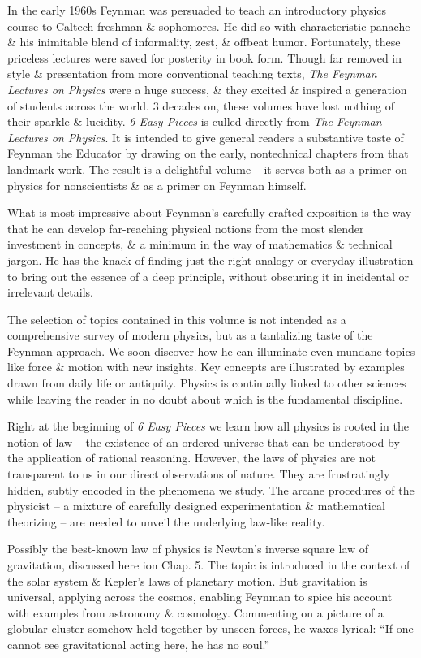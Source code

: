 \documentclass{article}
\begin{document}
In the early 1960s {\sc Feynman} was persuaded to teach an introductory physics course to Caltech freshman \& sophomores. He did so with characteristic panache \& his inimitable blend of informality, zest, \& offbeat humor. Fortunately, these priceless lectures were saved for posterity in book form. Though far removed in style \& presentation from more conventional teaching texts, {\it The Feynman Lectures on Physics} were a huge success, \& they excited \& inspired a generation of students across the world. 3 decades on, these volumes have lost nothing of their sparkle \& lucidity. {\it6 Easy Pieces} is culled directly from {\it The Feynman Lectures on Physics}. It is intended to give general readers a substantive taste of {\sc Feynman} the Educator by drawing on the early, nontechnical chapters from that landmark work. The result is a delightful volume -- it serves both as a primer on physics for nonscientists \& as a primer on {\sc Feynman} himself.

What is most impressive about {\sc Feynman}'s carefully crafted exposition is the way that he can develop far-reaching physical notions from the most slender investment in concepts, \& a minimum in the way of mathematics \& technical jargon. He has the knack of finding just the right analogy or everyday illustration to bring out the essence of a deep principle, without obscuring it in incidental or irrelevant details.

The selection of topics contained in this volume is not intended as a comprehensive survey of modern physics, but as a tantalizing taste of the {\sc Feynman} approach. We soon discover how he can illuminate even mundane topics like force \& motion with new insights. Key concepts are illustrated by examples drawn from daily life or antiquity. Physics is continually linked to other sciences while leaving the reader in no doubt about which is the fundamental discipline.

Right at the beginning of {\it6 Easy Pieces} we learn how all physics is rooted in the notion of law -- the existence of an ordered universe that can be understood by the application of rational reasoning. However, the laws of physics are not transparent to us in our direct observations of nature. They are frustratingly hidden, subtly encoded in the phenomena we study. The arcane procedures of the physicist -- a mixture of carefully designed experimentation \& mathematical theorizing -- are needed to unveil the underlying law-like reality.

Possibly the best-known law of physics is {\sc Newton}'s inverse square law of gravitation, discussed here ion Chap. 5. The topic is introduced in the context of the solar system \& {\sc Kepler}'s laws of planetary motion. But gravitation is universal, applying across the cosmos, enabling {\sc Feynman} to spice his account with examples from astronomy \& cosmology. Commenting on a picture of a globular cluster somehow held together by unseen forces, he waxes lyrical: ``If one cannot see gravitational acting here, he has no soul.''
\end{document}
